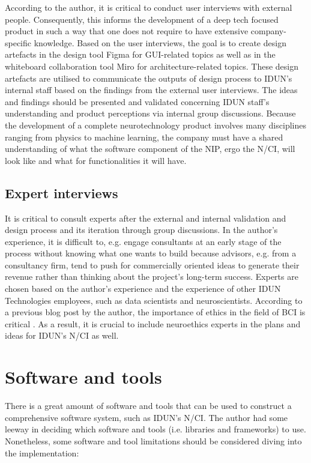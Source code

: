 According to the author, it is critical to conduct user interviews with external people. Consequently, this informs the development of a deep tech focused product in such a way that one does not require to have extensive company-specific knowledge. Based on the user interviews, the goal is to create design artefacts in the design tool Figma for GUI-related topics as well as in the whiteboard collaboration tool Miro for architecture-related topics. These design artefacts are utilised to communicate the outputs of design process to IDUN's internal staff based on the findings from the external user interviews. The ideas and findings should be presented and validated concerning IDUN staff's understanding and product perceptions via internal group discussions. Because the development of a complete neurotechnology product involves many disciplines ranging from physics to machine learning, the company must have a shared understanding of what the software component of the NIP, ergo the N/CI, will look like and what for functionalities it will have.

\subsection{Expert interviews}
\label{chapter3-expert-interviews}

It is critical to consult experts after the external and internal validation and design process and its iteration through group discussions. In the author's experience, it is difficult to, e.g. engage consultants at an early stage of the process without knowing what one wants to build because advisors, e.g. from a consultancy firm, tend to push for commercially oriented ideas to generate their revenue rather than thinking about the project's long-term success. Experts are chosen based on the author's experience and the experience of other IDUN Technologies employees, such as data scientists and neuroscientists. According to a previous blog post by the author, the importance of ethics in the field of BCI is critical \citep{burger_influence_2021}. As a result, it is crucial to include neuroethics experts in the plans and ideas for IDUN's N/CI as well.

\section{Software and tools}
\label{chapter3-software-and-tools}

There is a great amount of software and tools that can be used to construct a comprehensive software system, such as IDUN's N/CI. The author had some leeway in deciding which software and tools (i.e. libraries and frameworks) to use. Nonetheless, some software and tool limitations should be considered diving into the implementation:

